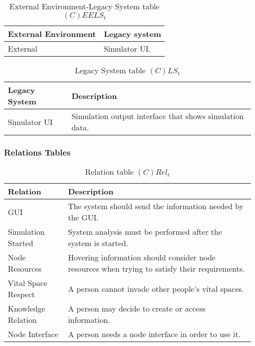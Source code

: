 \begin{table}[H]
	\centering
	\begin{tabular}{|p{4cm}|p{8cm}|}
			\hline
			\textbf{External Environment} & \textbf{Legacy system} \\
			\hline
			External & Simulator UI. \\
			\hline
		\end{tabular}
	\caption{External Environment-Legacy System table $(C)EELS_t$}
	\label{tab:ceelst}
\end{table}

\begin{table}[H]
	\centering
	\begin{tabular}{|p{4cm}|p{8cm}|}
			\hline
			\textbf{Legacy System} & \textbf{Description} \\
			\hline
			Simulator UI & Simulation output interface that shows simulation data. \\
			\hline
		\end{tabular}
	\caption{Legacy System table $(C)LS_t$}
	\label{tab:clst}
\end{table}

\subsubsection{Relations Tables}

\begin{table}[H]
	\centering
	\begin{tabular}{|p{4cm}|p{8cm}|}
			\hline
			\textbf{Relation} & \textbf{Description} \\
			\hline
			GUI & The system should send the information needed by the GUI. \\
			\hline
			Simulation Started & System analysis must be performed after the system
			is started. \\
			\hline
			Node Resources & Hovering information should consider node resources when
			trying to satisfy their requirements. \\
			\hline
			Vital Space Respect & A person cannot invade other people's vital spaces. \\
			\hline
			Knowledge Relation & A person may decide to create or access information. \\
			\hline
			Node Interface & A person needs a node interface in order to use it. \\
			\hline
		\end{tabular}
	\caption{Relation table $(C)Rel_t$}
	\label{tab:crelt}
\end{table}

